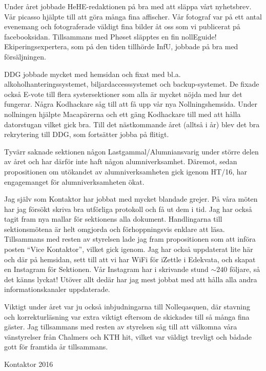 \documentclass[../_main/handlingar.tex]{subfiles}
\begin{document}

Under året jobbade HeHE-redaktionen på bra med att släppa vårt nyhetsbrev. Vår picasso hjälpte till att göra många fina affischer. Vår fotograf var på ett antal evenemang och fotograferade väldigt fina bilder åt oss som vi publicerat på facebooksidan. Tillsammans med Ph\o set släpptes en fin nollEguide! Ekiperingsexpertera, som på den tiden tillhörde InfU, jobbade på bra med försäljningen.

DDG jobbade mycket med hemsidan och fixat med bl.a. alkoholhanteringssystemet, biljardaccesssystemet och backup-systemet. De fixade också E-vote till flera systersektioner som alla är mycket nöjda med hur det fungerar. Några Kodhackare såg till att få upp vår nya Nollningshemsida. Under nollningen hjälpte Macapärerna och ett gäng Kodhackare till med att hålla datorstugan vilket gick bra. Till det nästkommande året (alltså i år) blev det bra rekrytering till DDG, som fortsätter jobba på flitigt.

Tyvärr saknade sektionen någon Lastgammal/Alumniansvarig under större delen av året och har därför inte haft någon alumniverksamhet. Däremot, sedan propositionen om utökandet av alumniverksamheten gick igenom HT/16, har engagemanget för alumniverksamheten ökat.

Jag själv som Kontaktor har jobbat med mycket blandade grejer. På våra möten har jag försökt skriva bra utförliga protokoll och få ut dem i tid. Jag har också tagit fram nya mallar för sektionens alla dokument. Handlingarna till sektionsmötena är helt omgjorda och förhoppningsvis enklare att läsa. Tillsammans med resten av styrelsen lade jag fram propositionen som att införa posten ``Vice Kontaktor'', vilket gick igenom. Jag har också uppdaterat lite här och där på hemsidan, sett till att vi har WiFi för iZettle i Edekvata, och skapat en Instagram för Sektionen. Vår Instagram har i skrivande stund $\sim240$ följare, så det känns lyckat! Utöver allt dedär har jag mest jobbat med att hålla alla andra informationskanaler uppdaterade.

Viktigt under året var ju också inbjudningarna till Nolleqasquen, där stavning och korrekturläsning var extra viktigt eftersom de skickades till så många fina gäster. Jag tillsammans med resten av styrelsen såg till att välkomna våra vänstyrelser från Chalmers och KTH hit, vilket var väldigt trevligt och bådade gott för framtida år tillsammans.

\begin{signatures}{1}
    \mvh
    \signature{Erik Månsson}{Kontaktor 2016}
\end{signatures}
\end{document}
